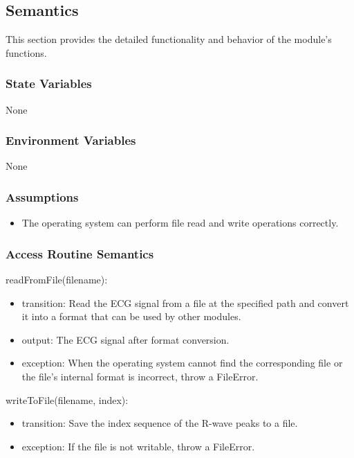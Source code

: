 \documentclass[12pt, titlepage]{article}
\begin{document}
\subsection{Semantics}

This section provides the detailed functionality and behavior of the module’s
functions.

\subsubsection{State Variables}

None

\subsubsection{Environment Variables}

None

\subsubsection{Assumptions}

\begin{itemize}
\item The operating system can perform file read and write operations correctly.
\end{itemize}

\subsubsection{Access Routine Semantics}

\noindent readFromFile(filename):
\begin{itemize}
\item transition: Read the ECG signal from a file at the specified path and
convert it into a format that can be used by other modules.
\item output: The ECG signal after format conversion.
\item exception: When the operating system cannot find the corresponding file or
the file's internal format is incorrect, throw a FileError.
\end{itemize}

\noindent writeToFile(filename, index):
\begin{itemize}
\item transition: Save the index sequence of the R-wave peaks to a file.
\item exception: If the file is not writable, throw a FileError.
\end{itemize}
\end{document}

